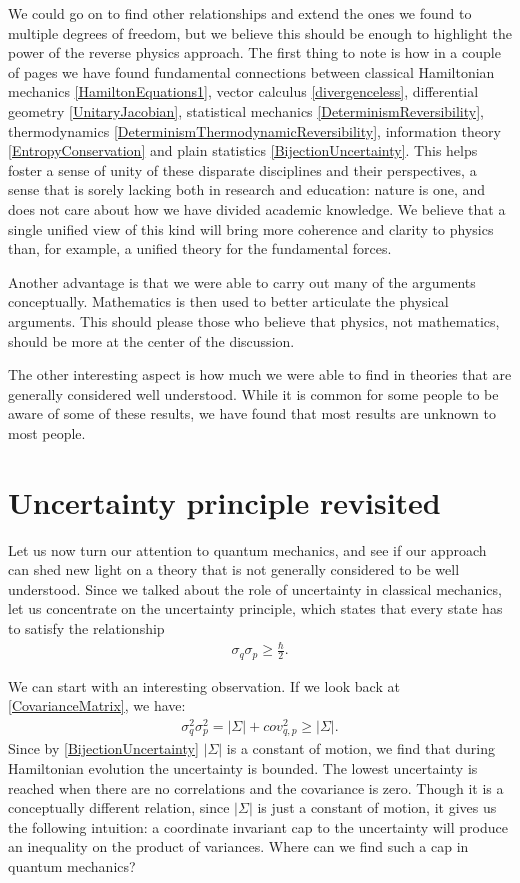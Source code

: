 \documentclass[10pt,twocolumn, nofootinbib]{revtex4-2}
\begin{document}
We could go on to find other relationships and extend the ones we found to multiple degrees of freedom, but we believe this should be enough to highlight the power of the reverse physics approach. The first thing to note is how in a couple of pages we have found fundamental connections between classical Hamiltonian mechanics \eqref{HamiltonEquations1}, vector calculus \eqref{divergenceless}, differential geometry \eqref{UnitaryJacobian}, statistical mechanics \eqref{DeterminismReversibility}, thermodynamics \eqref{DeterminismThermodynamicReversibility}, information theory \eqref{EntropyConservation} and plain statistics \eqref{BijectionUncertainty}. This helps foster a sense of unity of these disparate disciplines and their perspectives, a sense that is sorely lacking both in research and education: nature is one, and does not care about how we have divided academic knowledge. We believe that a single unified view of this kind will bring more coherence and clarity to physics than, for example, a unified theory for the fundamental forces.

Another advantage is that we were able to carry out many of the arguments conceptually. Mathematics is then used to better articulate the physical arguments. This should please those who believe that physics, not mathematics, should be more at the center of the discussion.\cite{hossenfelder2018lost, woit2006not}

The other interesting aspect is how much we were able to find in theories that are generally considered well understood. While it is common for some people to be aware of some of these results, we have found that most results are unknown to most people.

\section{Uncertainty principle revisited}

Let us now turn our attention to quantum mechanics, and see if our approach can shed new light on a theory that is not generally considered to be well understood. Since we talked about the role of uncertainty in classical mechanics, let us concentrate on the uncertainty principle, which states that every state has to satisfy the relationship
\begin{align}\label{UncertaintyPrinciple}
	\sigma_q \sigma_p \geq \frac{\hbar}{2}.
\end{align}

We can start with an interesting observation. If we look back at \eqref{CovarianceMatrix}, we have:
\begin{align}
	\sigma_q^2 \sigma_p^2 = |\Sigma| + cov_{q,p}^2 \geq |\Sigma|.
\end{align}
Since by \eqref{BijectionUncertainty} $|\Sigma|$ is a constant of motion, we find that during Hamiltonian evolution the uncertainty is bounded. The lowest uncertainty is reached when there are no correlations and the covariance is zero. Though it is a conceptually different relation, since $|\Sigma|$ is just a constant of motion, it gives us the following intuition: a coordinate invariant cap to the uncertainty will produce an inequality on the product of variances. Where can we find such a cap in quantum mechanics?
\end{document}
